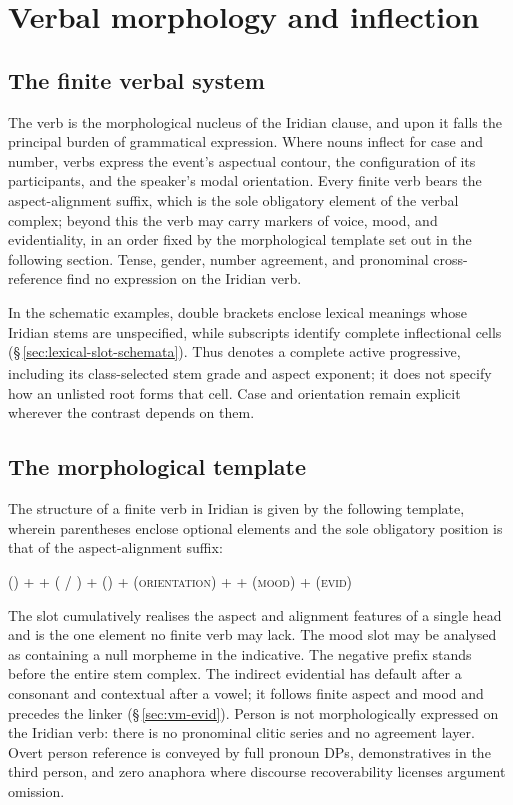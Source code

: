 \chapter{Verbal morphology and inflection}\label{ch:verbs}\label{ch:verbal-morphology}

\section{The finite verbal system}

The verb is the morphological nucleus of the Iridian clause, and upon it falls
the principal burden of grammatical expression. Where nouns inflect for case and number, verbs
express the event's aspectual contour, the configuration of its participants,
and the speaker's modal orientation. Every finite verb bears the aspect-alignment suffix,
which is the sole obligatory element of the verbal complex; beyond this the verb
may carry markers of voice, mood, and evidentiality, in an order fixed by the
morphological template set out in the following section. Tense, gender, number
agreement, and pronominal cross-reference find no expression on the Iridian
verb.

In the schematic examples, double brackets enclose lexical meanings whose
Iridian stems are unspecified, while subscripts identify complete inflectional
cells (§\,\ref{sec:lexical-slot-schemata}). Thus
\ird{[[write]]}\textsubscript{\Prog{}} denotes a complete active progressive,
including its class-selected stem grade and aspect exponent; it does not
specify how an unlisted root forms that cell. Case and orientation remain
explicit wherever the contrast depends on them.

\section{The morphological template}\label{sec:morph-template}

The structure of a finite verb in Iridian is given by the following template,
wherein parentheses enclose optional elements and the sole obligatory position
is that of the aspect-alignment suffix:

\medskip
\begin{center}
(\Neg{}) + \Stem{} + (\Antip{} / \Appl{}) + (\Caus{}) + (\textsc{orientation}) +  + (\textsc{mood}) + (\textsc{evid})
\end{center}
\medskip

The  slot cumulatively realises the aspect and alignment
features of a single head and is the one element no finite verb may lack.
The mood slot may be analysed as containing a null morpheme in the indicative. The negative prefix 
stands before the entire stem complex. The indirect evidential has default
 after a consonant and contextual  after a vowel;
it follows finite aspect and mood and precedes the linker
(§\,\ref{sec:vm-evid}). Person is not morphologically expressed on the Iridian
verb: there is no pronominal clitic series and no agreement layer. Overt person
reference is conveyed by full pronoun DPs, demonstratives in the third person,
and zero anaphora where discourse recoverability licenses argument omission.

